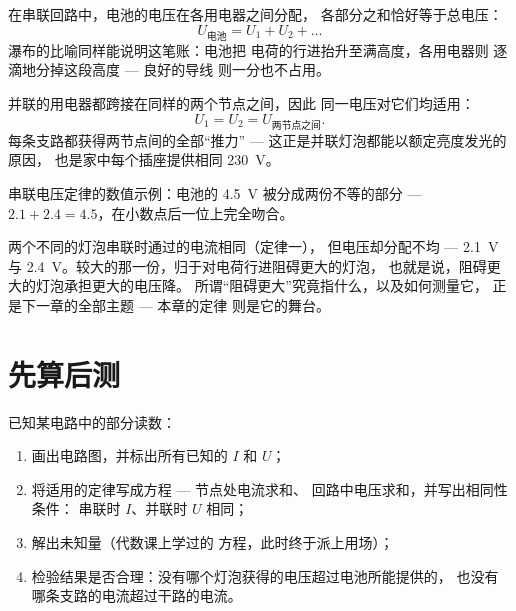 \begin{proposition}[串联回路的电压定律]\label{prop:g8:circuit-laws:seriesU}
在串联回路中，电池的电压在各用电器之间分配，
各部分之和恰好等于总电压：
\[
U_{\text{电池}} = U_1 + U_2 + \dots
\]
瀑布的比喻同样能说明这笔账：电池把
电荷的行进抬升至满高度，各用电器则
逐滴地分掉这段高度 --- 良好的导线
则一分也不占用。
\end{proposition}

\begin{proposition}[并联支路的电压定律]\label{prop:g8:circuit-laws:parallelU}
并联的用电器都跨接在同样的两个节点之间，因此
同一电压对它们均适用：
\[
U_1 = U_2 = U_{\text{两节点之间}} .
\]
每条支路都获得两节点间的全部“推力” ---
这正是并联灯泡都能以额定亮度发光的原因，
也是家中每个插座提供相同
\qty{230}{V}。
\end{proposition}

\begin{omfigure}

{\small 串联电压定律的数值示例：电池的
\qty{4.5}{V} 被分成两份不等的部分 --- $2.1 + 2.4 =
4.5$，在小数点后一位上完全吻合。}
\end{omfigure}

\begin{example}[为什么分配不均？]\label{ex:g8:circuit-laws:unequal}
两个不同的灯泡串联时通过的电流相同（定律一），
但电压却分配不均 --- \qty{2.1}{V} 与
\qty{2.4}{V}。较大的那一份，归于对电荷行进阻碍更大的灯泡，
也就是说，阻碍更大的灯泡承担更大的电压降。
所谓“阻碍更大”究竟指什么，以及如何测量它，
正是下一章的全部主题 --- 本章的定律
则是它的舞台。
\end{example}

\section{先算后测}

\begin{method}[用四条定律求解电路]\label{met:g8:circuit-laws:solve}
已知某电路中的部分读数：
\begin{enumerate}
  \item 画出电路图，并标出所有已知的 $I$ 和 $U$；
  \item 将适用的定律写成方程 --- 节点处电流求和、
        回路中电压求和，并写出相同性条件：
        串联时 $I$、并联时 $U$ 相同；
  \item 解出未知量（代数课上学过的
        方程，此时终于派上用场）；
  \item 检验结果是否合理：没有哪个灯泡获得的电压超过电池所能提供的，
        也没有哪条支路的电流超过干路的电流。
\end{enumerate}
\end{method}

